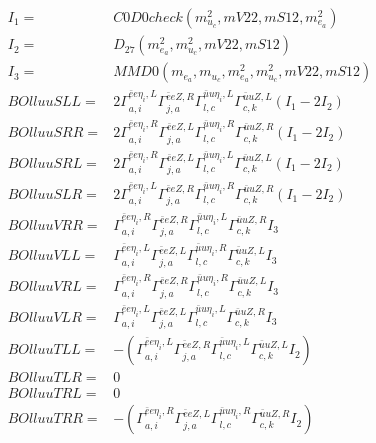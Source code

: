 \documentclass[A4,landscape]{article}
\begin{document}
\begin{align} 
I_1 = & C0D0check(m^2_{u_{{c}}}, mV22, mS12, m^2_{e_{{a}}}) \\ 
I_2 = & D_{27}(m^2_{e_{{a}}}, m^2_{u_{{c}}}, mV22, mS12) \\ 
I_3 = & MMD0(m_{e_{{a}}}, m_{u_{{c}}}, m^2_{e_{{a}}}, m^2_{u_{{c}}}, mV22, mS12) \\ 
  BOlluuSLL= & 2  \Gamma^{\bar{e}e \eta_i ,L}_{a, i} \Gamma^{\bar{e}e Z ,R}_{j, a} \Gamma^{\bar{u}u \eta_i ,L}_{l, c} \Gamma^{\bar{u}u Z ,L}_{c, k} (I_1 - 2 I_2) \\ 
  BOlluuSRR= & 2  \Gamma^{\bar{e}e \eta_i ,R}_{a, i} \Gamma^{\bar{e}e Z ,L}_{j, a} \Gamma^{\bar{u}u \eta_i ,R}_{l, c} \Gamma^{\bar{u}u Z ,R}_{c, k} (I_1 - 2 I_2) \\ 
  BOlluuSRL= & 2  \Gamma^{\bar{e}e \eta_i ,R}_{a, i} \Gamma^{\bar{e}e Z ,L}_{j, a} \Gamma^{\bar{u}u \eta_i ,L}_{l, c} \Gamma^{\bar{u}u Z ,L}_{c, k} (I_1 - 2 I_2) \\ 
  BOlluuSLR= & 2  \Gamma^{\bar{e}e \eta_i ,L}_{a, i} \Gamma^{\bar{e}e Z ,R}_{j, a} \Gamma^{\bar{u}u \eta_i ,R}_{l, c} \Gamma^{\bar{u}u Z ,R}_{c, k} (I_1 - 2 I_2) \\ 
  BOlluuVRR= &  \Gamma^{\bar{e}e \eta_i ,R}_{a, i} \Gamma^{\bar{e}e Z ,R}_{j, a} \Gamma^{\bar{u}u \eta_i ,L}_{l, c} \Gamma^{\bar{u}u Z ,R}_{c, k} I_3 \\ 
  BOlluuVLL= &  \Gamma^{\bar{e}e \eta_i ,L}_{a, i} \Gamma^{\bar{e}e Z ,L}_{j, a} \Gamma^{\bar{u}u \eta_i ,R}_{l, c} \Gamma^{\bar{u}u Z ,L}_{c, k} I_3 \\ 
  BOlluuVRL= &  \Gamma^{\bar{e}e \eta_i ,R}_{a, i} \Gamma^{\bar{e}e Z ,R}_{j, a} \Gamma^{\bar{u}u \eta_i ,R}_{l, c} \Gamma^{\bar{u}u Z ,L}_{c, k} I_3 \\ 
  BOlluuVLR= &  \Gamma^{\bar{e}e \eta_i ,L}_{a, i} \Gamma^{\bar{e}e Z ,L}_{j, a} \Gamma^{\bar{u}u \eta_i ,L}_{l, c} \Gamma^{\bar{u}u Z ,R}_{c, k} I_3 \\ 
  BOlluuTLL= & -( \Gamma^{\bar{e}e \eta_i ,L}_{a, i} \Gamma^{\bar{e}e Z ,R}_{j, a} \Gamma^{\bar{u}u \eta_i ,L}_{l, c} \Gamma^{\bar{u}u Z ,L}_{c, k} I_2) \\ 
  BOlluuTLR= & 0 \\ 
  BOlluuTRL= & 0 \\ 
  BOlluuTRR= & -( \Gamma^{\bar{e}e \eta_i ,R}_{a, i} \Gamma^{\bar{e}e Z ,L}_{j, a} \Gamma^{\bar{u}u \eta_i ,R}_{l, c} \Gamma^{\bar{u}u Z ,R}_{c, k} I_2) \\ 
\end{align} 
\end{document}

